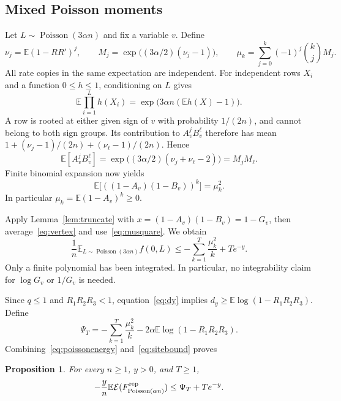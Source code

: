 \documentclass[11pt]{article}
\newtheorem{proposition}[theorem]{Proposition}
\theoremstyle{remark}
\newcommand{\E}{\mathbb{E}}
\newcommand{\Pois}{\operatorname{Poisson}}
\newcommand{\en}{\mathcal{E}}
\begin{document}
\subsection{Mixed Poisson moments}
Let $L\sim\Pois(3\alpha n)$ and fix a variable $v$. Define
\begin{equation}\label{eq:moments}
 \nu_j=\E(1-RR')^j,\qquad
 M_j=\exp\bigl((3\alpha/2)(\nu_j-1)\bigr),\qquad
 \mu_k=\sum_{j=0}^k(-1)^j\binom kj M_j.
\end{equation}
All rate copies in the same expectation are independent. For independent
rows $X_i$ and a function $0\leq h\leq1$, conditioning on $L$ gives
\[
 \E\prod_{i=1}^L h(X_i)
 =\exp\bigl(3\alpha n(\E h(X)-1)\bigr).
\]
A row is rooted at either given sign of $v$ with probability $1/(2n)$,
and cannot belong to both sign groups. Its contribution to $A_v^jB_v^\ell$
therefore has mean
$1+(\nu_j-1)/(2n)+(\nu_\ell-1)/(2n)$. Hence
\begin{equation}\label{eq:mixed}
 \E[A_v^jB_v^\ell]
 =\exp\bigl((3\alpha/2)(\nu_j+\nu_\ell-2)\bigr)=M_jM_\ell.
\end{equation}
Finite binomial expansion now yields
\begin{equation}\label{eq:musquare}
 \E\bigl[((1-A_v)(1-B_v))^k\bigr]=\mu_k^2.
\end{equation}
In particular $\mu_k=\E(1-A_v)^k\geq0$.

Apply Lemma~\ref{lem:truncate} with $x=(1-A_v)(1-B_v)=1-G_v$,
then average~\eqref{eq:vertex} and use~\eqref{eq:musquare}. We obtain
\begin{equation}\label{eq:sitebound}
 \frac1n\E_{L\sim\Pois(3\alpha n)} f(0,L)
 \leq-\sum_{k=1}^T\frac{\mu_k^2}{k}+Te^{-y}.
\end{equation}
Only a finite polynomial has been integrated. In particular, no
integrability claim for $\log G_v$ or $1/G_v$ is needed.

Since $q\leq1$ and $R_1R_2R_3<1$, equation~\eqref{eq:dy} implies
$d_y\geq\E\log(1-R_1R_2R_3)$. Define
\begin{equation}\label{eq:psi}
 \Psi_T=-\sum_{k=1}^T\frac{\mu_k^2}{k}
             -2\alpha\E\log(1-R_1R_2R_3).
\end{equation}
Combining~\eqref{eq:poissonenergy} and~\eqref{eq:sitebound} proves
\begin{proposition}\label{prop:energy}
For every $n\geq1$, $y>0$, and $T\geq1$,
\begin{equation}\label{eq:energybound}
 -\frac yn\E\en(F^{\rm rep}_{\Pois(\alpha n)})\leq\Psi_T+Te^{-y}.
\end{equation}
\end{proposition}
\end{document}
